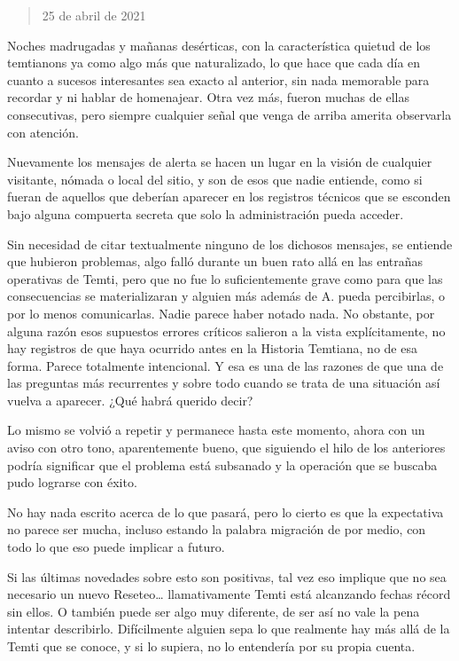 \documentclass[
  spanish,
]{book}
\begin{document}
\begin{quote}
25 de abril de 2021
\end{quote}

Noches madrugadas y mañanas desérticas, con la característica quietud de los temtianons ya como algo más que naturalizado, lo que hace que cada día en cuanto a sucesos interesantes sea exacto al anterior, sin nada memorable para recordar y ni hablar de homenajear. Otra vez más, fueron muchas de ellas consecutivas, pero siempre cualquier señal que venga de arriba amerita observarla con atención.

Nuevamente los mensajes de alerta se hacen un lugar en la visión de cualquier visitante, nómada o local del sitio, y son de esos que nadie entiende, como si fueran de aquellos que deberían aparecer en los registros técnicos que se esconden bajo alguna compuerta secreta que solo la administración pueda acceder.

Sin necesidad de citar textualmente ninguno de los dichosos mensajes, se entiende que hubieron problemas, algo falló durante un buen rato allá en las entrañas operativas de Temti, pero que no fue lo suficientemente grave como para que las consecuencias se materializaran y alguien más además de A. pueda percibirlas, o por lo menos comunicarlas. Nadie parece haber notado nada. No obstante, por alguna razón esos supuestos errores críticos salieron a la vista explícitamente, no hay registros de que haya ocurrido antes en la Historia Temtiana, no de esa forma. Parece totalmente intencional. Y esa es una de las razones de que una de las preguntas más recurrentes y sobre todo cuando se trata de una situación así vuelva a aparecer. ¿Qué habrá querido decir?

Lo mismo se volvió a repetir y permanece hasta este momento, ahora con un aviso con otro tono, aparentemente bueno, que siguiendo el hilo de los anteriores podría significar que el problema está subsanado y la operación que se buscaba pudo lograrse con éxito.

No hay nada escrito acerca de lo que pasará, pero lo cierto es que la expectativa no parece ser mucha, incluso estando la palabra migración de por medio, con todo lo que eso puede implicar a futuro.

Si las últimas novedades sobre esto son positivas, tal vez eso implique que no sea necesario un nuevo Reseteo\ldots{} llamativamente Temti está alcanzando fechas récord sin ellos. O también puede ser algo muy diferente, de ser así no vale la pena intentar describirlo. Difícilmente alguien sepa lo que realmente hay más allá de la Temti que se conoce, y si lo supiera, no lo entendería por su propia cuenta.
\end{document}
